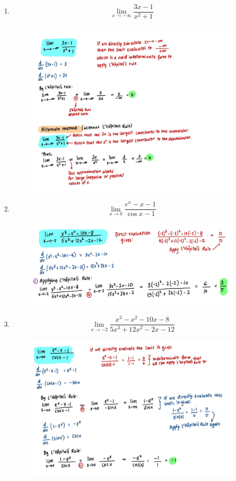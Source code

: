 \documentclass{article}
\begin{document}
\begin{enumerate}
    \item $$\lim_{x\rightarrow - \infty}\frac{3x-1}{x^2 + 1}$$
    \begin{figure}[H]
        \centering
        \includegraphics[width=\linewidth]{Q1.jpg}
        \label{fig:Q1}
    \end{figure}
    \newpage
    \item $$\lim_{x \rightarrow 0}\frac{e^x-x-1}{\cos x - 1}$$
    \begin{figure}[H]
        \centering
        \includegraphics[width=\linewidth]{Q2.jpg}
        \label{fig:Q2}
    \end{figure}
    \item $$\lim_{x \rightarrow -2}\frac{x^3-x^2-10x-8}{5x^3+12x^2-2x-12}$$
    \begin{figure}[H]
        \centering
        \includegraphics[width=0.9\linewidth]{Q3.jpg}

\end{figure}
\end{enumerate}
\end{document}

